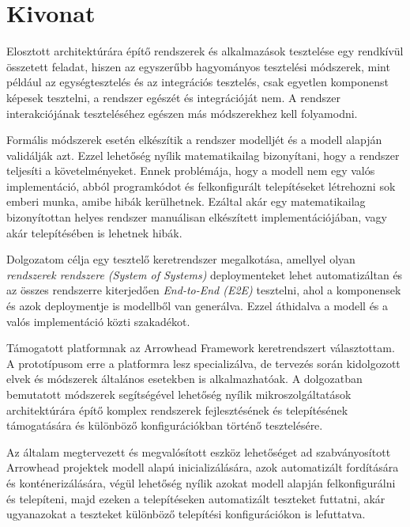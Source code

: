 \setcounter{page}{1}

\selecthungarian

\setlength{\parindent}{0pt}
\setlength{\parskip}{0.6em}

\chapter*{Kivonat}

Elosztott architektúrára építő rendszerek és alkalmazások tesztelése egy rendkívül összetett feladat, hiszen az egyszerűbb hagyományos tesztelési módszerek, mint például az egységtesztelés és az integrációs tesztelés, csak egyetlen komponenst képesek tesztelni, a rendszer egészét és integrációját nem. A rendszer interakciójának teszteléséhez egészen más módszerekhez kell folyamodni.

Formális módszerek esetén elkészítik a rendszer modelljét és a modell alapján validálják azt. Ezzel lehetőség nyílik matematikailag bizonyítani, hogy a rendszer teljesíti a követelményeket. Ennek problémája, hogy a modell nem egy valós implementáció, abból programkódot és felkonfigurált telepítéseket létrehozni sok emberi munka, amibe hibák kerülhetnek. Ezáltal akár egy matematikailag bizonyítottan helyes rendszer manuálisan elkészített implementációjában, vagy akár telepítésében is lehetnek hibák. 

Dolgozatom célja egy tesztelő keretrendszer megalkotása, amellyel olyan \emph{rendszerek rendszere (System of Systems)} deploymenteket lehet automatizáltan és az összes rendszerre kiterjedően \emph{End-to-End (E2E)} tesztelni, ahol a komponensek és azok deploymentje is modellből van generálva. Ezzel áthidalva a modell és a valós implementáció közti szakadékot. 

Támogatott platformnak az Arrowhead Framework keretrendszert választottam. A prototípusom erre a platformra lesz specializálva, de tervezés során kidolgozott elvek és módszerek általános esetekben is alkalmazhatóak. A dolgozatban bemutatott módszerek segítségével lehetőség nyílik mikroszolgáltatások architektúrára építő komplex rendszerek fejlesztésének és telepítésének támogatására és különböző konfigurációkban történő tesztelésére.

Az általam megtervezett és megvalósított eszköz lehetőséget ad szabványosított Arrowhead projektek modell alapú inicializálására, azok automatizált fordítására és konténerizálására, végül lehetőség nyílik azokat modell alapján felkonfigurálni és telepíteni, majd ezeken a telepítéseken automatizált teszteket futtatni, akár ugyanazokat a teszteket különböző telepítési konfigurációkon is lefuttatva.

